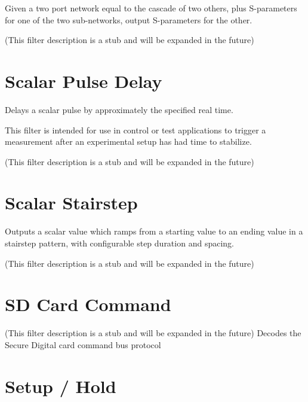 Given a two port network equal to the cascade of two others, plus S-parameters for one of the two sub-networks, output
S-parameters for the other.

(This filter description is a stub and will be expanded in the future)

\pagebreak
\section{Scalar Pulse Delay}

Delays a scalar pulse by approximately the specified real time.

This filter is intended for use in control or test applications to trigger a measurement after an experimental setup has
had time to stabilize.

(This filter description is a stub and will be expanded in the future)

\pagebreak
\section{Scalar Stairstep}

Outputs a scalar value which ramps from a starting value to an ending value in a stairstep pattern, with configurable
step duration and spacing.

(This filter description is a stub and will be expanded in the future)

\pagebreak
\section{SD Card Command}


(This filter description is a stub and will be expanded in the future)
Decodes the Secure Digital card command bus protocol

\pagebreak
\section{Setup / Hold}

